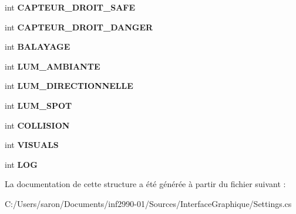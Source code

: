 \begin{DoxyCompactItemize}
\item 
\hypertarget{struct_interface_graphique_1_1_debug_settings_a0323937a17c31dca0e8470ada9171889}{int {\bfseries C\-A\-P\-T\-E\-U\-R\-\_\-\-D\-R\-O\-I\-T\-\_\-\-S\-A\-F\-E}}\label{struct_interface_graphique_1_1_debug_settings_a0323937a17c31dca0e8470ada9171889}

\item 
\hypertarget{struct_interface_graphique_1_1_debug_settings_a1ae2dbc2bf32f43ba5d6fc38af2e1983}{int {\bfseries C\-A\-P\-T\-E\-U\-R\-\_\-\-D\-R\-O\-I\-T\-\_\-\-D\-A\-N\-G\-E\-R}}\label{struct_interface_graphique_1_1_debug_settings_a1ae2dbc2bf32f43ba5d6fc38af2e1983}

\item 
\hypertarget{struct_interface_graphique_1_1_debug_settings_afd90bbf00846ddf8db271ea800569ac6}{int {\bfseries B\-A\-L\-A\-Y\-A\-G\-E}}\label{struct_interface_graphique_1_1_debug_settings_afd90bbf00846ddf8db271ea800569ac6}

\item 
\hypertarget{struct_interface_graphique_1_1_debug_settings_a13cd4cccdf207a03bd0de2e9d66a0464}{int {\bfseries L\-U\-M\-\_\-\-A\-M\-B\-I\-A\-N\-T\-E}}\label{struct_interface_graphique_1_1_debug_settings_a13cd4cccdf207a03bd0de2e9d66a0464}

\item 
\hypertarget{struct_interface_graphique_1_1_debug_settings_abcdf6c594ee2be7c6334058923fd6782}{int {\bfseries L\-U\-M\-\_\-\-D\-I\-R\-E\-C\-T\-I\-O\-N\-N\-E\-L\-L\-E}}\label{struct_interface_graphique_1_1_debug_settings_abcdf6c594ee2be7c6334058923fd6782}

\item 
\hypertarget{struct_interface_graphique_1_1_debug_settings_a829f4f49fcad36b63a8efa04013b21e2}{int {\bfseries L\-U\-M\-\_\-\-S\-P\-O\-T}}\label{struct_interface_graphique_1_1_debug_settings_a829f4f49fcad36b63a8efa04013b21e2}

\item 
\hypertarget{struct_interface_graphique_1_1_debug_settings_a33ca4cb1f95d52b3036b5653a19e10a7}{int {\bfseries C\-O\-L\-L\-I\-S\-I\-O\-N}}\label{struct_interface_graphique_1_1_debug_settings_a33ca4cb1f95d52b3036b5653a19e10a7}

\item 
\hypertarget{struct_interface_graphique_1_1_debug_settings_a54278ff77bdbcb736e7156e76cd43a75}{int {\bfseries V\-I\-S\-U\-A\-L\-S}}\label{struct_interface_graphique_1_1_debug_settings_a54278ff77bdbcb736e7156e76cd43a75}

\item 
\hypertarget{struct_interface_graphique_1_1_debug_settings_a590cd73799d00b0bb2bc7cd9f570f36e}{int {\bfseries L\-O\-G}}\label{struct_interface_graphique_1_1_debug_settings_a590cd73799d00b0bb2bc7cd9f570f36e}

\end{DoxyCompactItemize}


La documentation de cette structure a été générée à partir du fichier suivant \-:\begin{DoxyCompactItemize}
\item 
C\-:/\-Users/saron/\-Documents/inf2990-\/01/\-Sources/\-Interface\-Graphique/Settings.\-cs\end{DoxyCompactItemize}
